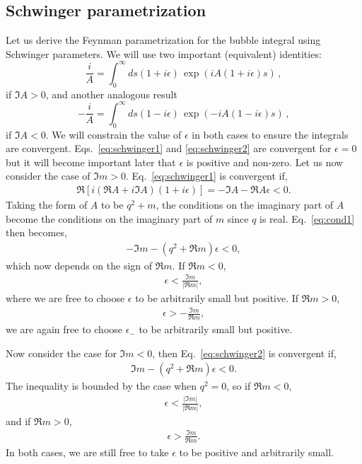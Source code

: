 \documentclass[twoside]{article}
\begin{document}
\subsection{Schwinger parametrization}
Let us derive the Feynman parametrization for the bubble integral using Schwinger parameters. We will use two important (equivalent) identities:
\begin{equation}
\label{eq:schwinger1}
  \frac{i}{A} = \int_0^\infty ds (1 + i\epsilon)\, \exp(i A (1 + i \epsilon)s)\,,
\end{equation}
if $\Im A >0$, and another analogous result
\begin{equation}
\label{eq:schwinger2}
-\frac{i}{A} = \int_0^\infty ds (1 - i\epsilon)\, \exp(-i A(1 - i\epsilon) s)\,,
\end{equation}
if $\Im A <0$. We will constrain the value of $\epsilon$ in both cases to ensure the integrals are convergent. Eqs.~\eqref{eq:schwinger1} and \eqref{eq:schwinger2} are
convergent for $\epsilon = 0$ but it will become important later that $\epsilon$ is positive and non-zero. Let us now consider the case of
$\Im m > 0$. Eq.~\eqref{eq:schwinger1} is convergent if,
\begin{align}
\label{eq:cond1}
  \Re\left[ i(\Re A + i \Im A)(1 + i\epsilon) \right] = -\Im A - \Re A \epsilon< 0.
\end{align}
Taking the form of $A$ to be $q^2 + m$, the conditions on the imaginary part of $A$ become the conditions on the imaginary part of
$m$ since $q$ is real. Eq.~\eqref{eq:cond1} then becomes,
\begin{align}
  -\Im m - (q^2 + \Re m)\epsilon < 0,
\end{align}
which now depends on the sign of $\Re m$. If $\Re m < 0$,
\begin{align}
  \epsilon < \frac{\Im m}{\lvert \Re m \rvert},
\end{align}
where we are free to choose $\epsilon$ to be arbitrarily small but positive. If $\Re m > 0$,
\begin{align}
  \epsilon > -\frac{\Im m}{\Re m},
\end{align}
we are again free to choose $\epsilon_-$ to be arbitrarily small but positive.

Now consider the case for $\Im m < 0$, then Eq.~\eqref{eq:schwinger2} is convergent if,
\begin{align}
  \Im m - (q^2 + \Re m)\epsilon < 0.
\end{align}
The inequality is bounded by the case when $q^2 = 0$, so if $\Re m < 0$,
\begin{align}
  \epsilon < \frac{\lvert \Im m\rvert}{\lvert \Re m\rvert},
\end{align}
and if $\Re m > 0$,
\begin{align}
  \epsilon > \frac{\Im m}{\Re m}.
\end{align}
In both cases, we are still free to take $\epsilon$ to be positive and arbitrarily small.
\end{document}

